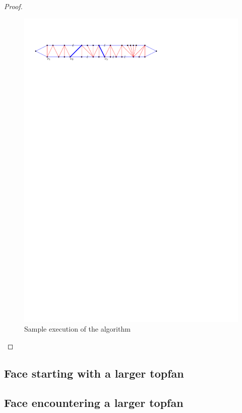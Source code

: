 \begin{proof}
\begin{figure}[h]
  \centering
  \includegraphics[scale=1]{blueFaceSubdivision/img/sampleExecution}
  \caption{Sample execution of the algorithm}
  \label{fig:subdiv:sampleExecution}
\end{figure}

\end{proof}


\subsection{Face starting with a larger topfan}

\subsection{Face encountering a larger topfan}



